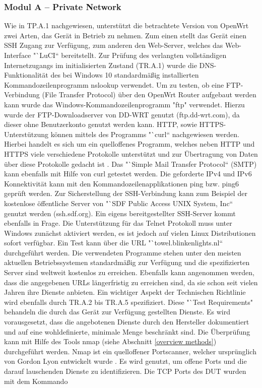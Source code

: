 \documentclass[a4paper]{book}
\begin{document}
\begin{large}
\subsubsection{Modul A – Private Network}
\begin{onehalfspace}
Wie in TP.A.1 nachgewiesen, unterstützt die betrachtete Version von OpenWrt zwei Arten, das Gerät in Betrieb zu nehmen. Zum einen stellt das Gerät einen SSH Zugang zur Verfügung, zum anderen den Web-Server, welches das Web-Interface "`LuCI“ bereitstellt. Zur Prüfung des verlangten vollständigen Internetzugangs im initialisierten Zustand (TR.A.1) wurde die DNS-Funktionalität des bei Windows 10 standardmäßig installierten Kommandozeilenprogramm nslookup verwendet. Um zu testen, ob eine FTP-Verbindung (File Transfer Protocol) über den OpenWrt Router aufgebaut werden kann wurde das Windows-Kommandozeilenprogramm "ftp" verwendet. Hierzu wurde der FTP-Downloadserver von DD-WRT genutzt (ftp.dd-wrt.com), da dieser ohne Benutzerkonto genutzt werden kann. HTTP, sowie HTTPS-Unterstützung können mittels des Programms "`curl“ nachgewiesen werden. Hierbei handelt es sich um ein quelloffenes Programm, welches neben HTTP und HTTPS viele verschiedene Protokolle unterstützt und zur Übertragung von Daten über diese Protokolle gedacht ist \cite{DanielStenberg.2020}. Das "`Simple Mail Transfer Protocol“ (SMTP) kann ebenfalls mit Hilfe von curl getestet werden. Die geforderte IPv4 und IPv6 Konnektivität kann mit den Kommandozeilenapplikationen ping bzw. ping6 geprüft werden. Zur Sicherstellung der SSH-Verbindung kann zum Beispiel der kostenlose öffentliche Server von "`SDF Public Access UNIX System, Inc“ genutzt werden (ssh.sdf.org). Ein eigens bereitgestellter SSH-Server kommt ebenfalls in Frage. Die Unterstützung für das Telnet Protokoll muss unter Windows zunächst aktiviert werden, es ist jedoch auf vielen Linux Distributionen sofort verfügbar. Ein Test kann über die URL "`towel.blinkenlights.nl“ durchgeführt werden. Die verwendeten Programme stehen unter den meisten aktuellen Betriebssystemen standardmäßig zur Verfügung und die spezifizierten Server sind weltweit kostenlos zu erreichen. Ebenfalls kann angenommen werden, dass die angegebenen URLs längerfristig zu erreichen sind, da sie schon seit vielen Jahren ihre Dienste anbieten.	
\newline \indent Ein wichtiger Aspekt der Technischen Richtlinie wird ebenfalls durch TR.A.2 bis TR.A.5 spezifiziert. Diese "`Test Requirements"{} behandeln die durch das Gerät zur Verfügung gestellten Dienste. Es wird vorausgesetzt, dass die angebotenen Dienste durch den Hersteller dokumentiert und auf eine wohldefinierte, minimale Menge beschränkt sind. Die Überprüfung kann mit Hilfe des Tools nmap (siehe Abschnitt \ref{overview methods}) durchgeführt werden. Nmap ist ein quelloffener Portscanner, welcher ursprünglich von Gordon Lyon entwickelt wurde \cite{Lyon.2008}. Es wird genutzt, um offene Ports und die darauf lauschenden Dienste zu identifizieren. Die TCP Ports des DUT wurden mit dem Kommando \\


\end{onehalfspace}
\end{large}
\end{document}
